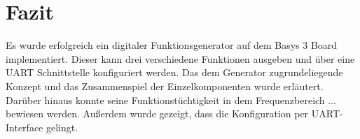 \chapter{Fazit}
Es wurde erfolgreich ein digitaler Funktionsgenerator auf dem Basys 3 Board implementiert.
Dieser kann drei verschiedene Funktionen ausgeben und über eine UART Schnittstelle konfiguriert werden.
Das dem Generator zugrundeliegende Konzept und das Zusammenspiel der Einzelkomponenten wurde erläutert.
Darüber hinaus konnte seine Funktionstüchtigkeit in dem Frequenzbereich ... bewiesen werden.
Außerdem wurde gezeigt, dass die Konfiguration per UART-Interface gelingt.
